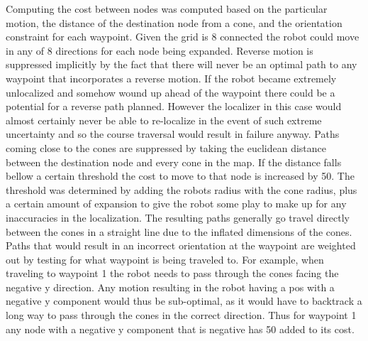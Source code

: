 \documentclass[letterpaper,12pt]{article}
\begin{document}
Computing the cost between nodes was computed based on the particular motion, the distance of the destination node from a cone, and the orientation constraint for each waypoint. Given the grid is 8 connected the robot could move in any of 8 directions for each node being expanded. Reverse motion is suppressed implicitly by the fact that there will never be an optimal path to any waypoint that incorporates a reverse motion. If the robot became extremely unlocalized and somehow wound up ahead of the waypoint there could be a potential for a reverse path planned. However the localizer in this case would almost certainly never be able to re-localize in the event of such extreme uncertainty and so the course traversal would result in failure anyway. Paths coming close to the cones are suppressed by taking the euclidean distance between the destination node and every cone in the map. If the distance falls bellow a certain threshold the cost to move to that node is increased by 50. The threshold was determined by adding the robots radius with the cone radius, plus a certain amount of expansion to give the robot some play to make up for any inaccuracies in the localization. The resulting paths generally go travel directly between the cones in a straight line due to the inflated dimensions of the cones. Paths that would result in an incorrect orientation at the waypoint are weighted out by testing for what waypoint is being traveled to. For example, when traveling to waypoint 1 the robot needs to pass through the cones facing the negative y direction. Any motion resulting in the robot having a pos with a negative y component would thus be sub-optimal, as it would have to backtrack a long way to pass through the cones in the correct direction. Thus for waypoint 1 any node with a negative y component that is negative has 50 added to its cost. 
\end{document}
